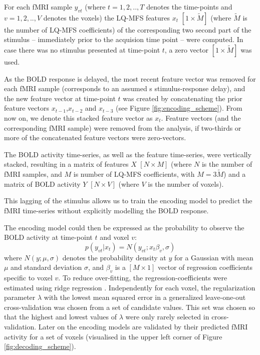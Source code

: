 For each f{MRI} sample $y_{vt}$ (where $t=1,2,..,T$ denotes the time-points and
$v=1,2,..,V$ denotes the voxels) the LQ-MFS features $x_{t}$
$[1\times\widetilde{M}]$ (where $\widetilde{M}$ is the number of LQ-MFS
coefficients) of the corresponding two second part of the stimulus -- immediately
prior to the acquision time point -- were
computed. In case there was no stimulus presented at time-point $t$, a zero
vector $[1\times\widetilde{M}]$ was used. 

As the BOLD response is delayed,  the most recent feature vector was removed
for each f{MRI} sample (corresponds to an assumed \unit[2]{s} stimulus-response
delay), and the new feature vector at time-point $t$ was created by
concatenating the prior feature vectors $x_{t-1}$,$x_{t-2}$ and $x_{t-3}$ (see
Figure \ref{fig:encoding_scheme}). From now on, we denote this stacked feature
vector as $x_{t}$.  Feature vectors (and the corresponding f{MRI} sample) were
removed from the analysis, if two-thirds or more of the concatenated feature
vectors were zero-vectors.

The BOLD activity time-series, as well as the feature time-series, were
vertically stacked, resulting in a matrix of features $X$ $[N\times M]$ (where
$N$ is the number of f{MRI} samples, and $M$ is number of LQ-MFS coefficients,
with $M=3\widetilde{M}$) and a matrix of BOLD activity $Y$ $[N\times V]$ (where
$V$ is the number of voxels).

This lagging of the stimulus allows us to train the encoding model to predict
the f{MRI} time-series without explicitly modelling the BOLD response.

The encoding model could then be expressed as the probability to observe the
BOLD activity at time-point $t$ and voxel $v$:
\begin{equation}
  \label{eq:encmo}
  p(y_{vt}|x_{t}) = N(y_{vt};x_{t}\beta_{v},\sigma)
\end{equation}
where $N(y;\mu,\sigma)$ denotes the probability density at $y$ for a
Gaussian with mean $\mu$ and standard deviation $\sigma$, and $\beta_{v}$ is a
$[M\times1]$ vector of regression coefficients specific to voxel $v$. To reduce
over-fitting, the regression-coefficients were estimated using ridge regression
\citep{HK70}.  Independently for each voxel, the regularization parameter
$\lambda$ with the lowest mean squared error in a generalized leave-one-out
cross-validation \citep{GHW79} was chosen from a set of candidate values.
This set was chosen so that the highest and lowest values of $\lambda$ were only
rarely selected in cross-validation.
Later on the encoding models are validated by their predicted f{MRI} activity
for a set of voxels (visualised in the upper left corner of Figure
\ref{fig:decoding_scheme}). 

